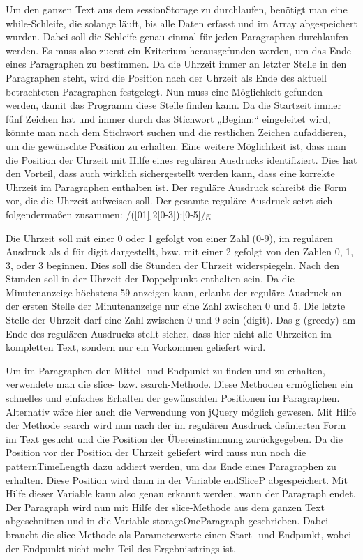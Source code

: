 Um den ganzen Text aus dem sessionStorage zu durchlaufen, benötigt man eine while-Schleife, die solange läuft, bis alle Daten erfasst und im Array abgespeichert wurden. Dabei soll die Schleife genau einmal für jeden Paragraphen durchlaufen werden. Es muss also zuerst ein Kriterium herausgefunden werden, um das Ende eines Paragraphen zu bestimmen. Da die Uhrzeit immer an letzter Stelle in den Paragraphen steht, wird die Position nach der Uhrzeit als Ende des aktuell betrachteten Paragraphen festgelegt. Nun muss eine Möglichkeit gefunden werden, damit das Programm diese Stelle finden kann. Da die Startzeit immer fünf Zeichen hat und immer durch das Stichwort „Beginn:“ eingeleitet wird, könnte man nach dem Stichwort suchen und die restlichen Zeichen aufaddieren, um die gewünschte Position zu erhalten. Eine weitere Möglichkeit ist, dass man die Position der Uhrzeit mit Hilfe eines regulären Ausdrucks identifiziert. Dies hat den Vorteil, dass auch wirklich sichergestellt werden kann, dass eine korrekte Uhrzeit im Paragraphen enthalten ist. Der reguläre Ausdruck schreibt die Form vor, die die Uhrzeit aufweisen soll. Der gesamte reguläre Ausdruck setzt sich folgendermaßen zusammen: /([01]\d|2[0-3]):[0-5]\d/g 

Die Uhrzeit soll mit einer 0 oder 1 gefolgt von einer Zahl (0-9), im regulären Ausdruck als d für digit dargestellt, bzw. mit einer 2 gefolgt von den Zahlen 0, 1, 3, oder 3 beginnen. Dies soll die Stunden der Uhrzeit widerspiegeln. Nach den Stunden soll in der Uhrzeit der Doppelpunkt enthalten sein. Da die Minutenanzeige höchstens 59 anzeigen kann, erlaubt der reguläre Ausdruck an der ersten Stelle der Minutenanzeige nur eine Zahl zwischen 0 und 5. Die letzte Stelle der Uhrzeit darf eine Zahl zwischen 0 und 9 sein (digit). Das g (greedy) am Ende des regulären Ausdrucks stellt sicher, dass hier nicht alle Uhrzeiten im kompletten Text, sondern nur ein Vorkommen geliefert wird.  

Um im Paragraphen den Mittel- und Endpunkt zu finden und zu erhalten, verwendete man die slice- bzw. search-Methode. Diese Methoden ermöglichen ein schnelles und einfaches Erhalten der gewünschten Positionen im Paragraphen. Alternativ wäre hier auch die Verwendung von jQuery möglich gewesen.
Mit Hilfe der Methode search wird nun nach der im regulären Ausdruck definierten Form im Text gesucht und die Position der Übereinstimmung zurückgegeben. Da die Position vor der Position der Uhrzeit geliefert wird muss nun noch die patternTimeLength dazu addiert werden, um das Ende eines Paragraphen zu erhalten. Diese Position wird dann in der Variable endSliceP abgespeichert. Mit Hilfe dieser Variable kann also genau erkannt werden, wann der Paragraph endet. Der Paragraph wird nun mit Hilfe der slice-Methode aus dem ganzen Text abgeschnitten und in die Variable storageOneParagraph geschrieben. Dabei braucht die slice-Methode als Parameterwerte einen Start- und Endpunkt, wobei der Endpunkt nicht mehr Teil des Ergebnisstrings ist. 

